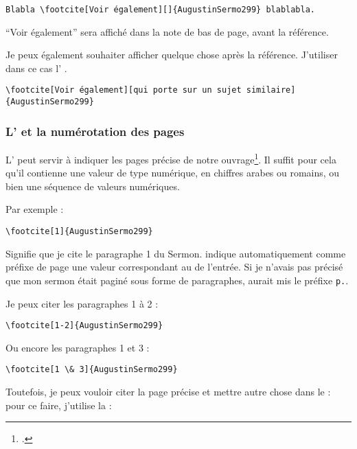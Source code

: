 \begin{verbatim}
Blabla \footcite[Voir également][]{AugustinSermo299} blablabla.
\end{verbatim}

\enquote{Voir également} sera affiché dans la note de bas de page, avant la référence.

Je peux également souhaiter afficher quelque chose après la référence. J'utiliser dans ce cas l' .

\begin{verbatim}
\footcite[Voir également][qui porte sur un sujet similaire]{AugustinSermo299}
\end{verbatim}

\subsubsection{L'  et la numérotation des pages}

L'  peut servir à indiquer les pages précise de notre ouvrage\footcite[On consultera pour plus de détails : ][105-106]{BibLaTeX}. Il suffit pour cela qu'il contienne une valeur de type numérique, en chiffres arabes ou romains, ou bien une séquence de valeurs numériques.

Par exemple : 
\begin{verbatim}
\footcite[1]{AugustinSermo299}
\end{verbatim}

Signifie que je cite le paragraphe 1 du Sermon.  indique automatiquement comme préfixe de page une valeur correspondant au   de l'entrée. Si je n'avais pas précisé que mon sermon était paginé sous forme de paragraphes,  aurait mis le préfixe \verb|p.|.

Je peux citer les paragraphes 1 à 2 :

\begin{verbatim}
\footcite[1-2]{AugustinSermo299}
\end{verbatim}

Ou encore les paragraphes 1 et 3 :

\begin{verbatim}
\footcite[1 \& 3]{AugustinSermo299}
\end{verbatim}

Toutefois, je peux vouloir citer la page précise et mettre autre chose dans le   : pour ce faire, j'utilise la   :

